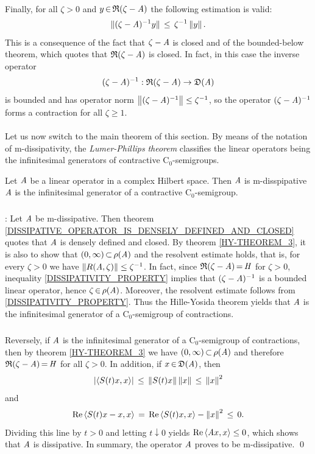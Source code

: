 \documentclass[11pt,twoside]{article}
\begin{document}
\paragraph{} %
Finally,
for all $\zeta > 0$ and $y {\,\in\,} \mathfrak{R}(\zeta-\mathit{A})$
the following estimation is valid:
\[
\lVert (\zeta-\mathit{A})^{-1}y \rVert \, \leq \, \zeta^{-1} \left\lVert y \right\rVert.
\]
This is a consequence of the fact that $\zeta - \mathit{A}$ is closed
and of the bounded-below theorem,
which quotes that $\mathfrak{R}(\zeta-\mathit{A})$ is closed.
In fact,
in this case the inverse operator
\[
(\zeta - \mathit{A})^{-1} : \mathfrak{R}(\zeta-\mathit{A}) \to \mathfrak{D}(\mathit{A})
\]
is bounded and has operator norm
$\left\lVert (\zeta-\mathit{A})^{-1} \right\rVert \leq \zeta^{-1}$,
so the operator $(\zeta-\mathit{A})^{-1}$ forms a contraction for all $\zeta \geq 1$.

\paragraph{} %
Let us now switch to the main theorem of this section.
By means of the notation of m-dissipativity,
the \textit{Lumer-Phillips} \textit{theorem} classifies the linear operators
being the infinitesimal generators of contractive C$_0$-semigroups.

\begin{theorem}\label{LUMER-PHILLIPS_THEOREM}
Let $\mathit{A}$ be a linear operator in a complex Hilbert space.
Then $\mathit{A}$ is m-disspipative
\iff
$\mathit{A}$ is the infinitesimal generator of a contractive C$_0$-semigroup.
\end{theorem}

\subparagraph{}
\Proof:
Let $\mathit{A}$ be m-dissipative.
Then theorem \ref{DISSIPATIVE_OPERATOR_IS_DENSELY_DEFINED_AND_CLOSED} quotes
that $\mathit{A}$ is densely defined and closed.
By theorem \ref{HY-THEOREM_3},
it is also to show that
$(0,\infty) {\,\subset\,} \rho(\mathit{A})$ and the resolvent estimate holds,
that is,
for every $\zeta > 0$ we have $\left\lVert R(\mathit{A},\zeta) \right\rVert \leq \zeta^{-1}$.
In fact,
since $\mathfrak{R}(\zeta - \mathit{A}) {\,=\,} \mathit{H}$ for $\zeta > 0$,
inequality \eqref{DISSIPATIVITY_PROPERTY} implies
that $(\zeta-\mathit{A})^{-1}$ is a bounded linear operator,
hence $\zeta {\,\in\,} \rho(\mathit{A})$.
Moreover,
the resolvent estimate follows from \eqref{DISSIPATIVITY_PROPERTY}.
Thus the Hille-Yosida theorem yields that
$\mathit{A}$ is the infinitesimal generator of a C$_0$-semigroup of contractions.

\subparagraph{}
Reversely,
if $\mathit{A}$ is the infinitesimal generator of a C$_0$-semigroup of contractions,
then by theorem \ref{HY-THEOREM_3} we have $(0,\infty) {\,\subset\,} \rho(\mathit{A})$
and therefore $\mathfrak{R}(\zeta-\mathit{A}) {\,=\,} \mathit{H}$ for all $\zeta > 0$.
In addition,
if $x {\,\in\,} \mathfrak{D}(\mathit{A})$,
then
\[
\abs{\scalar{S(t)x}{x} } \, \leq \, \norm{S(t)x} \norm{x} \, \leq \, \norm{x}^2
\]
and
\[
\operatorname{Re} \, \langle S(t)x - x,x \rangle \,=\, \operatorname{Re} \, \langle S(t)x,x \rangle - \left\lVert x \right\rVert^2
\, \leq \, 0.
\]
Dividing this line by $t > 0$ and letting $t \downarrow 0$ yields
$\operatorname{Re} \, \langle \mathit{A} x,x \rangle \leq 0$,
which shows that $\mathit{A}$ is dissipative.
In summary, the operator $\mathit{A}$ proves to be m-dissipative.
\qed
\end{document}
